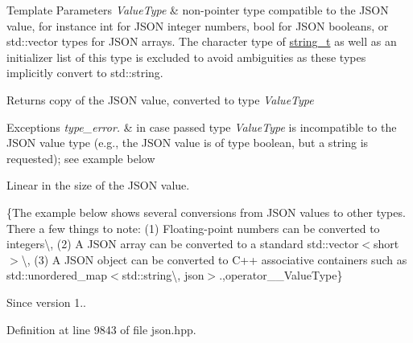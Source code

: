 \begin{DoxyTemplParams}{Template Parameters}
{\em Value\+Type} & non-\/pointer type compatible to the J\+S\+ON value, for instance {\ttfamily int} for J\+S\+ON integer numbers, {\ttfamily bool} for J\+S\+ON booleans, or {\ttfamily std\+::vector} types for J\+S\+ON arrays. The character type of \hyperlink{classnlohmann_1_1basic__json_a61f8566a1a85a424c7266fb531dca005}{string\+\_\+t} as well as an initializer list of this type is excluded to avoid ambiguities as these types implicitly convert to {\ttfamily std\+::string}.\\
\hline
\end{DoxyTemplParams}
\begin{DoxyReturn}{Returns}
copy of the J\+S\+ON value, converted to type {\itshape Value\+Type} 
\end{DoxyReturn}

\begin{DoxyExceptions}{Exceptions}
{\em type\+\_\+error.} & in case passed type {\itshape Value\+Type} is incompatible to the J\+S\+ON value type (e.\+g., the J\+S\+ON value is of type boolean, but a string is requested); see example below\\
\hline
\end{DoxyExceptions}
Linear in the size of the J\+S\+ON value.

\{The example below shows several conversions from J\+S\+ON values to other types. There a few things to note\+: (1) Floating-\/point numbers can be converted to integers\textbackslash{}, (2) A J\+S\+ON array can be converted to a standard {\ttfamily std\+::vector$<$short$>$}\textbackslash{}, (3) A J\+S\+ON object can be converted to C++ associative containers such as {\ttfamily std\+::unordered\+\_\+map$<$std\+::string\textbackslash{}, json$>$}.,operator\+\_\+\+\_\+\+Value\+Type\}

\begin{DoxySince}{Since}
version 1.. 
\end{DoxySince}


Definition at line 9843 of file json.\+hpp.

